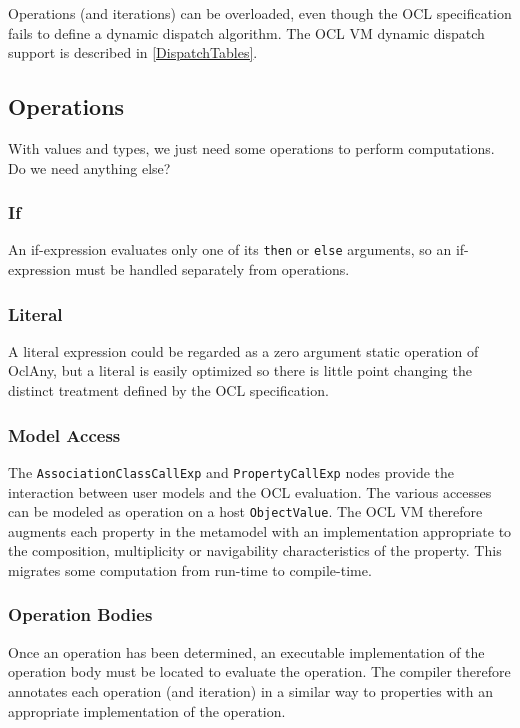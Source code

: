 \documentclass{acm_proc_article-sp}
\begin{document}
Operations (and iterations)  can be overloaded, even though the OCL specification fails to define a dynamic dispatch algorithm. The OCL VM dynamic dispatch support is described in \ref{DispatchTables}.

\subsection{Operations}

With values and types, we just need some operations to perform computations. Do we need anything else?

\subsubsection{If}

An if-expression evaluates only one of its \verb|then| or \verb|else| arguments, so an if-expression must be handled separately from operations.

\subsubsection{Literal}

A literal expression could be regarded as a zero argument static operation of OclAny, but a literal is easily optimized so there is little point changing the distinct treatment defined by the OCL specification.

\subsubsection{Model Access}

The \verb|AssociationClassCallExp| and \verb|PropertyCallExp| nodes provide the interaction between user models and the OCL evaluation. The various accesses can be modeled as operation on a host \verb|ObjectValue|. The OCL VM therefore augments each property in the metamodel with an implementation appropriate to the composition, multiplicity or navigability characteristics of the property. This migrates some computation from run-time to compile-time.

\subsubsection{Operation Bodies}

Once an operation has been determined, an executable implementation of the operation body must be located to evaluate the operation. The compiler therefore annotates each operation (and iteration) in a similar way to properties with an appropriate implementation of the operation.
\end{document}
